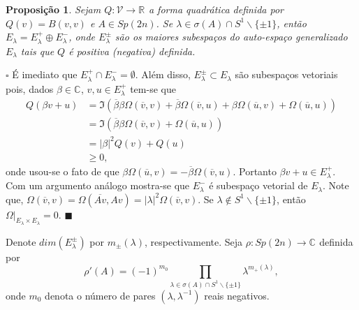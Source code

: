 \documentclass[12pt]{book}
\newtheorem{proposicao}[teorema]{Proposição}
\newenvironment{prova}[1]{$\square$ #1}{\hfill$\blacksquare$}
\newcommand{\autoespaco}[1]{E_{#1}}
\newcommand{\circulo}{S^{1}}
\newcommand{\complementar}[2]{#1 \backslash #2}
\newcommand{\complexificado}[1]{\mathcal{#1}}
\newcommand{\complexo}[1]{\mathbb{C}^{#1}}
\newcommand{\espectrooperador}[1]{\sigma(#1)}
\newcommand{\formaSimpleticaExtendida}[2]{\Omega(#1, #2)}
\newcommand{\gruposimpletico}[1]{Sp(#1)}
\newcommand{\parteImaginaria}[1]{\Im(#1)}
\newcommand{\real}[1]{\mathbb{R}^{#1}}
\newcommand{\reta}{\real{}}
\begin{document}
	\begin{proposicao}\label{proposicao_forma_quadratica_Q}
		Sejam  $Q: \complexificado{V} \to \reta$ a forma quadrática definida por $Q(v) = B(v,v)$ e $A \in \gruposimpletico{2n}$. Se $\lambda\in \espectrooperador{A} \cap \complementar{\circulo}{\{\pm 1 \} }$, então   $\autoespaco{\lambda} = \autoespaco{\lambda}^{+}\oplus \autoespaco{\lambda}^{-}$, onde $\autoespaco{\lambda}^{\pm}$ são os maiores subespaços do auto-espaço generalizado $\autoespaco{\lambda}$ tais que $Q$ é positiva (negativa) definida.
	\end{proposicao}
	\begin{prova}
		É imediato que $\autoespaco{\lambda}^{+} \cap \autoespaco{\lambda}^{-} = \emptyset$. Além disso, $\autoespaco{\lambda}^{\pm} \subset \autoespaco{\lambda}$ são subespaços vetoriais pois, dados $\beta\in \complexo{}$, $v, u\in \autoespaco{\lambda}^{+}$ tem-se que 
		$$
		\begin{aligned}
		Q(\beta v +u) &= \parteImaginaria{\overline{\beta}\beta\formaSimpleticaExtendida{\overline{v}}{v}+ \overline{\beta}\formaSimpleticaExtendida{\overline{v}}{u}+ \beta\formaSimpleticaExtendida{\overline{u}}{v}+ \formaSimpleticaExtendida{\overline{u}}{u}}
		\\
		&=\parteImaginaria{\overline{\beta}\beta\formaSimpleticaExtendida{\overline{v}}{v}+ \formaSimpleticaExtendida{\overline{u}}{u}}
		\\
		&=|\beta|^{2}Q(v)+Q(u)
		\\
		&\geq0,
		\end{aligned}
		$$
		onde usou-se o fato de que $\beta\formaSimpleticaExtendida{\overline{u}}{v}=-\overline{\beta}\formaSimpleticaExtendida{\overline{v}}{u}$. Portanto $\beta v +u \in \autoespaco{\lambda}^{+}$. Com um argumento análogo mostra-se que $\autoespaco{\lambda}^{-}$ é subespaço vetorial de $\autoespaco{\lambda}$. Note que, $\formaSimpleticaExtendida{\overline{v}}{v}=\formaSimpleticaExtendida{\overline{Av}}{Av} =|\lambda|^{2}\formaSimpleticaExtendida{\overline{v}}{v}$. Se $\lambda \notin \complementar{\circulo}{\{\pm 1 \} }$, então $\Omega|_{\autoespaco{\lambda}\times \autoespaco{\lambda}} = 0$.
	\end{prova}
	
	Denote $dim(\autoespaco{\lambda}^{\pm})$ por $m_{\pm}(\lambda)$, respectivamente.  Seja $\rho: \gruposimpletico{2n}\to \complexo{}$ definida por
	$$
	\rho'(A) = 	(-1)^{m_{0}} \prod_{\lambda \in \sigma(A)\cap \complementar{\circulo}{\{\pm 1 \}  }}\lambda^{m_{+}(\lambda)},
	$$
	onde $m_{0}$ denota o número de pares $(\lambda, \lambda^{-1})$ reais negativos.
\end{document}
